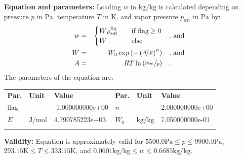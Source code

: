 \textbf{Equation and parameters:}
\newline
%
Loading $w$ in $\si{\kilogram\per\kilogram}$ is calculated depending on pressure $p$ in $\si{\pascal}$, temperature $T$ in $\si{\kelvin}$, and vapor pressure $p_\mathrm{sat}$ in $\si{\pascal}$ by:
%
\begin{equation*}
\begin{split}
w &=& \begin{cases} W \rho_\mathrm{sat}^{\mathrm{liq}} & \quad \text{if flag} \geq 0 \\ W & \quad \text{else} \end{cases} & \quad\text{, and} \\
W &=& W_0 \exp \left( - \left( \nicefrac{A}{E} \right) ^{n} \right) & \quad\text{, and} \\
A &=& R T \ln \left( \nicefrac{p_\mathrm{sat}}{p} \right) & \quad\text{.} \\
\end{split}
\end{equation*}
%
The parameters of the equation are:
%
\begin{longtable}[l]{lll|lll}
\toprule
\addlinespace
\textbf{Par.} & \textbf{Unit} & \textbf{Value} &	\textbf{Par.} & \textbf{Unit} & \textbf{Value} \\
\addlinespace
\midrule
\endhead

\bottomrule
\endfoot
\bottomrule
\endlastfoot
\addlinespace

flag & - & -1.000000000e+00 & $n$ & - & 2.000000000e+00 \\
$E$ & $\si{\joule\per\mole}$ & 4.790785223e+03 & $W_0$ & $\si{\kilogram\per\kilogram}$ & 7.050000000e-01 \\

\addlinespace\end{longtable}

\textbf{Validity:}
\newline
Equation is approximately valid for $5500.0 \si{\pascal} \leq p \leq 9900.0 \si{\pascal}$,  $293.15 \si{\kelvin} \leq T \leq 333.15 \si{\kelvin}$, and $0.0601 \si{\kilogram\per\kilogram} \leq w \leq 0.6685 \si{\kilogram\per\kilogram}$.
\newline

